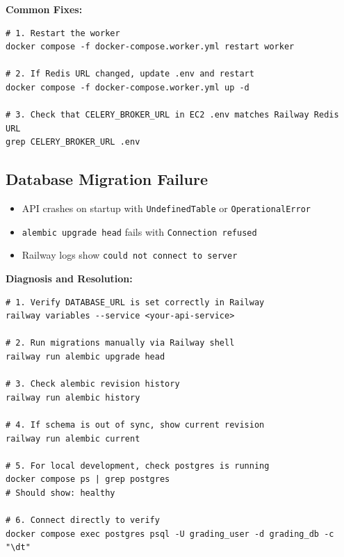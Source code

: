 \documentclass[12pt,a4paper]{article}
\begin{document}
\textbf{Common Fixes:}

\begin{lstlisting}[style=terminal]
# 1. Restart the worker
docker compose -f docker-compose.worker.yml restart worker

# 2. If Redis URL changed, update .env and restart
docker compose -f docker-compose.worker.yml up -d

# 3. Check that CELERY_BROKER_URL in EC2 .env matches Railway Redis URL
grep CELERY_BROKER_URL .env
\end{lstlisting}

\subsection{Database Migration Failure}

\begin{troublebox}[Symptoms]
\begin{itemize}
  \item API crashes on startup with \texttt{UndefinedTable} or \texttt{OperationalError}
  \item \texttt{alembic upgrade head} fails with \texttt{Connection refused}
  \item Railway logs show \texttt{could not connect to server}
\end{itemize}
\end{troublebox}

\textbf{Diagnosis and Resolution:}

\begin{lstlisting}[style=terminal]
# 1. Verify DATABASE_URL is set correctly in Railway
railway variables --service <your-api-service>

# 2. Run migrations manually via Railway shell
railway run alembic upgrade head

# 3. Check alembic revision history
railway run alembic history

# 4. If schema is out of sync, show current revision
railway run alembic current

# 5. For local development, check postgres is running
docker compose ps | grep postgres
# Should show: healthy

# 6. Connect directly to verify
docker compose exec postgres psql -U grading_user -d grading_db -c "\dt"
\end{lstlisting}

\end{document}
